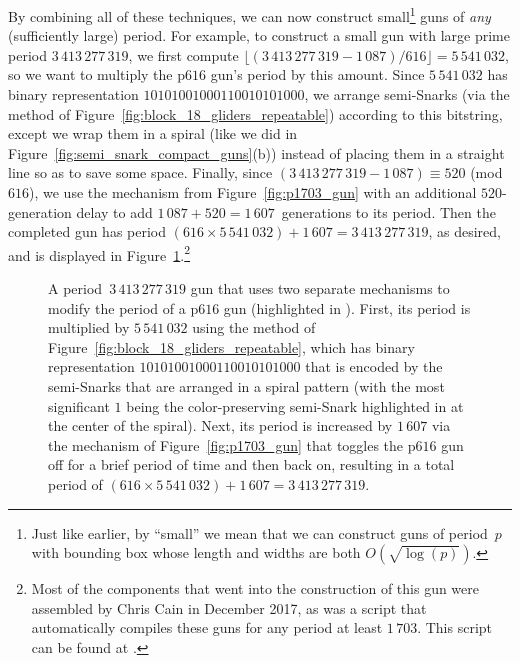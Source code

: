 By combining all of these techniques, we can now construct small\footnote{Just like earlier, by ``small'' we mean that we can construct guns of period~$p$ with bounding box whose length and widths are both $O(\sqrt{\log(p)})$.} guns of \emph{any} (sufficiently large) period. For example, to construct a small gun with large prime period $3\, 413\, 277\, 319$, we first compute $\lfloor (3\, 413\, 277\, 319 - 1\, 087) / 616 \rfloor = 5\, 541\, 032$, so we want to multiply the p$616$ gun's period by this amount. Since $5\, 541\, 032$ has binary representation $10101001000110010101000$, we arrange semi-Snarks (via the method of Figure~\ref{fig:block_18_gliders_repeatable}) according to this bitstring, except we wrap them in a spiral (like we did in Figure~\ref{fig:semi_snark_compact_guns}(b)) instead of placing them in a straight line so as to save some space. Finally, since $(3\, 413\, 277\, 319 - 1\, 087) \equiv 520$ (mod $616$), we use the mechanism from Figure~\ref{fig:p1703_gun} with an additional $520$-generation delay to add $1\, 087+520 = 1\, 607$~generations to its period. Then the completed gun has period $(616 \times 5\, 541\, 032) + 1\, 607 = 3\, 413\, 277\, 319$, as desired, and is displayed in Figure~\ref{fig:p3413277319_gun}.\footnote{Most of the components that went into the construction of this gun were assembled by Chris Cain in December 2017, as was a script that automatically compiles these guns for any period at least $1\, 703$. This script can be found at .}

\begin{figure}[!htb]
	\centering
	\caption{A period~$3\, 413\, 277\, 319$ gun that uses two separate mechanisms to modify the period of a p$616$ gun (highlighted in ). First, its period is multiplied by $5\, 541\, 032$ using the method of Figure~\ref{fig:block_18_gliders_repeatable}, which has binary representation $10101001000110010101000$ that is encoded by the semi-Snarks that are arranged in a spiral pattern (with the most significant $1$ being the color-preserving semi-Snark highlighted in  at the center of the spiral). Next, its period is increased by $1\, 607$ via the mechanism of Figure~\ref{fig:p1703_gun} that toggles the p$616$ gun off for a brief period of time and then back on, resulting in a total period of $(616 \times 5\, 541\, 032) + 1\, 607 = 3\, 413\, 277\, 319$.}
	\label{fig:p3413277319_gun}
\end{figure}


